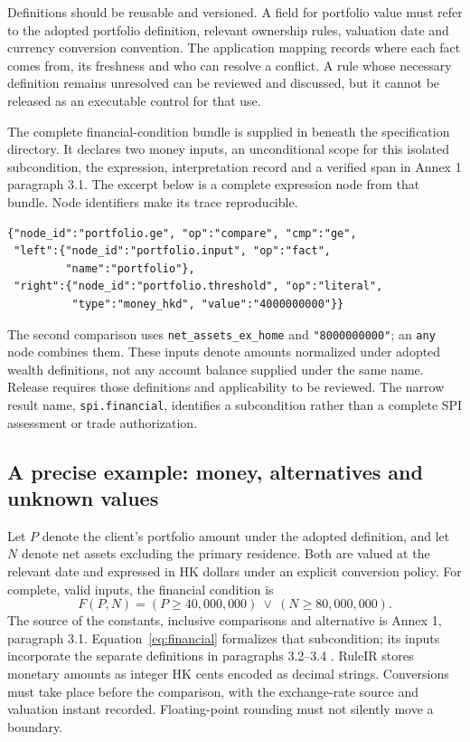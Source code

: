 Definitions should be reusable and versioned. A field for portfolio value must
refer to the adopted portfolio definition, relevant ownership rules, valuation
date and currency conversion convention. The application mapping records where
each fact comes from, its freshness and who can resolve a conflict. A rule whose
necessary definition remains unresolved can be reviewed and discussed, but it
cannot be released as an executable control for that use.

The complete financial-condition bundle is supplied in
 beneath the specification directory.
It declares two money inputs, an unconditional scope for this isolated
subcondition, the expression, interpretation record and a verified span in
Annex 1 paragraph 3.1. The excerpt below is a complete expression node from
that bundle. Node identifiers make its trace reproducible.

\begin{lstlisting}[caption={The portfolio comparison in the supplied JSON bundle. Amounts are HK cents.}]
{"node_id":"portfolio.ge", "op":"compare", "cmp":"ge",
 "left":{"node_id":"portfolio.input", "op":"fact",
         "name":"portfolio"},
 "right":{"node_id":"portfolio.threshold", "op":"literal",
          "type":"money_hkd", "value":"4000000000"}}
\end{lstlisting}

The second comparison uses \texttt{net\_assets\_ex\_home} and
\texttt{"8000000000"}; an \texttt{any} node combines them. These inputs denote
amounts normalized under adopted wealth definitions, not any account balance
supplied under the same name. Release requires those definitions and applicability
to be reviewed. The narrow result name, \texttt{spi.financial}, identifies a
subcondition rather than a complete SPI assessment or trade authorization.



\subsection{A precise example: money, alternatives and unknown values}
\label{sec:semantics}

Let $P$ denote the client's portfolio amount under the adopted definition, and
let $N$ denote net assets excluding the primary residence. Both are valued at the
relevant date and expressed in HK dollars under an explicit conversion policy.
For complete, valid inputs, the financial condition is
\begin{equation}
 F(P,N)=(P\geq 40{,}000{,}000)\ \lor\ (N\geq 80{,}000{,}000).
 \label{eq:financial}
\end{equation}
The source of the constants, inclusive comparisons and alternative is Annex 1,
paragraph 3.1. Equation~\eqref{eq:financial} formalizes that subcondition; its
inputs incorporate the separate definitions in paragraphs 3.2--3.4
\citep{sfcspiannex1}. RuleIR stores monetary amounts as
integer HK cents encoded as decimal strings. Conversions must take place
before the comparison, with the exchange-rate source and valuation instant
recorded. Floating-point rounding must not silently move a boundary.

